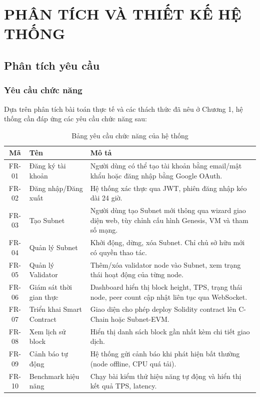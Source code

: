 \chapter{PHÂN TÍCH VÀ THIẾT KẾ HỆ THỐNG}

\section{Phân tích yêu cầu}

\subsection{Yêu cầu chức năng}

Dựa trên phân tích bài toán thực tế và các thách thức đã nêu ở Chương 1, hệ thống cần đáp ứng các yêu cầu chức năng sau:

\begin{table}[H]
\centering
\caption{Bảng yêu cầu chức năng của hệ thống}
\label{tab:functional_requirements}
\begin{tabular}{|c|p{3cm}|p{8cm}|}
\hline
\textbf{Mã} & \textbf{Tên} & \textbf{Mô tả} \\ \hline
FR-01 & Đăng ký tài khoản & Người dùng có thể tạo tài khoản bằng email/mật khẩu hoặc đăng nhập bằng Google OAuth. \\ \hline
FR-02 & Đăng nhập/Đăng xuất & Hệ thống xác thực qua JWT, phiên đăng nhập kéo dài 24 giờ. \\ \hline
FR-03 & Tạo Subnet & Người dùng tạo Subnet mới thông qua wizard giao diện web, tùy chỉnh cấu hình Genesis, VM và tham số mạng. \\ \hline
FR-04 & Quản lý Subnet & Khởi động, dừng, xóa Subnet. Chỉ chủ sở hữu mới có quyền thao tác. \\ \hline
FR-05 & Quản lý Validator & Thêm/xóa validator node vào Subnet, xem trạng thái hoạt động của từng node. \\ \hline
FR-06 & Giám sát thời gian thực & Dashboard hiển thị block height, TPS, trạng thái node, peer count cập nhật liên tục qua WebSocket. \\ \hline
FR-07 & Triển khai Smart Contract & Giao diện cho phép deploy Solidity contract lên C-Chain hoặc Subnet-EVM. \\ \hline
FR-08 & Xem lịch sử block & Hiển thị danh sách block gần nhất kèm chi tiết giao dịch. \\ \hline
FR-09 & Cảnh báo tự động & Hệ thống gửi cảnh báo khi phát hiện bất thường (node offline, CPU quá tải). \\ \hline
FR-10 & Benchmark hiệu năng & Chạy bài kiểm thử hiệu năng tự động và hiển thị kết quả TPS, latency. \\ \hline
\end{tabular}
\end{table}


